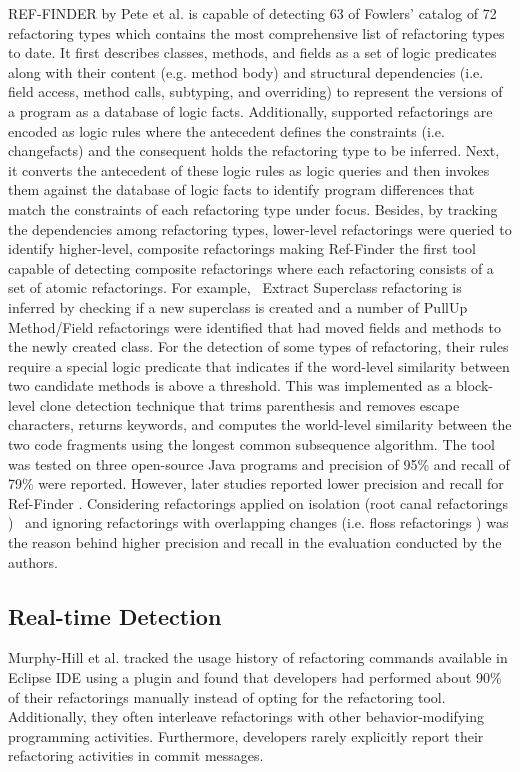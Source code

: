 \documentclass[letterpaper,12pt,onecolumn,final]{report}
\begin{document}
REF-FINDER \cite{Kim2010} by Pete et al. \cite{Prete2010} is capable of detecting 63 of Fowlers' catalog \cite{Fowler1999} of 72 refactoring types which contains the most comprehensive list of refactoring types to date. It first describes classes, methods, and fields as a set of logic predicates along with their content (e.g. method body) and structural dependencies (i.e. field access, method calls, subtyping, and overriding) to represent the versions of a program as a database of logic facts. Additionally, supported refactorings are encoded as logic rules where the antecedent defines the constraints (i.e. changefacts) and the consequent holds the refactoring type to be inferred. Next, it converts the antecedent of these logic rules as logic queries and then invokes them against the database of logic facts to identify program differences that match the constraints of each refactoring type under focus. Besides, by tracking the dependencies among refactoring types, lower-level refactorings were queried to identify higher-level, composite refactorings making Ref-Finder the first tool capable of detecting composite refactorings where each refactoring consists of a set of atomic refactorings. For example,  Extract Superclass refactoring is inferred by checking if a new superclass is created and a number of PullUp Method/Field refactorings were identified that had moved fields and methods to the newly created class. For the detection of some types of refactoring, their rules require a special logic predicate that indicates if the word-level similarity between two candidate methods is above a threshold. This was implemented as a block-level clone detection technique that trims parenthesis and removes escape characters, returns keywords, and computes the world-level similarity between the two code fragments using the longest common subsequence algorithm. The tool was tested on three open-source Java programs and precision of 95\% and recall of 79\% were reported. However, later studies reported lower precision and recall for Ref-Finder \cite{Soares2013} \cite{Silva2017} \cite{Tan2019}. Considering refactorings applied on isolation (root canal refactorings \cite{MurphyHill2012})  and ignoring refactorings with overlapping changes (i.e. floss refactorings \cite{MurphyHill2012}) was the reason behind higher precision and recall in the evaluation conducted by the authors.

\subsection{Real-time Detection}
Murphy-Hill et al. \cite{MurphyHill2012} tracked the usage history of refactoring commands available in Eclipse IDE using a plugin and found that developers had performed about 90\% of their refactorings manually instead of opting for the refactoring tool. Additionally, they often interleave refactorings with other behavior-modifying programming activities. Furthermore, developers rarely explicitly report their refactoring activities in commit messages.
\end{document}
